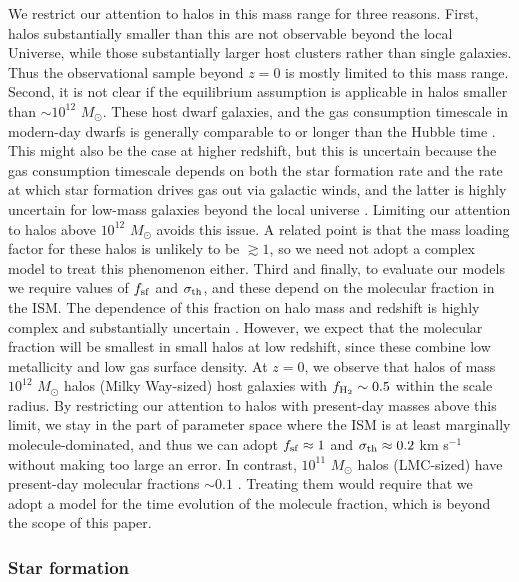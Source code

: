 \documentclass[useAMS,usenatbib]{mn2e}
\begin{document}
We restrict our attention to halos in this mass range for three reasons. First, halos substantially smaller than this are not observable beyond the local Universe, while those substantially larger host clusters rather than single galaxies. Thus the observational sample beyond $z=0$ is mostly limited to this mass range. Second, it is not clear if the equilibrium assumption is applicable in halos smaller than $\sim 10^{12}$ $M_\odot$. These host dwarf galaxies, and the gas consumption timescale in modern-day dwarfs is generally comparable to or longer than the Hubble time \citep[e.g.,][]{bolatto11a, hunter12a, jameson16a}. This might also be the case at higher redshift, but this is uncertain because the gas consumption timescale depends on both the star formation rate and the rate at which star formation drives gas out via galactic winds, and the latter is highly uncertain for low-mass galaxies beyond the local universe \citep{forbes14b}. Limiting our attention to halos above $10^{12}$ $M_\odot$ avoids this issue. A related point is that the mass loading factor for these halos is unlikely to be $\gtrsim 1$, so we need not adopt a complex model to treat this phenomenon either. Third and finally, to evaluate our models we require values of $f_{\rm sf}$ and $\sigma_{\rm th}$, and these depend on the molecular fraction in the ISM. The dependence of this fraction on halo mass and redshift is highly complex and substantially uncertain \citep[e.g.,][]{obreschkow09a, fu10a, lagos11a, krumholz12d, forbes14a}. However, we expect that the molecular fraction will be smallest in small halos at low redshift, since these combine low metallicity and low gas surface density. At $z=0$, we observe that halos of mass $10^{12}$ $M_\odot$ halos (Milky Way-sized) host galaxies with $f_{\rm H_2}\sim 0.5$ within the scale radius. By restricting our attention to halos with present-day masses above this limit, we stay in the part of parameter space where the ISM is at least marginally molecule-dominated, and thus we can adopt $f_{\rm sf} \approx 1$ and $\sigma_{\rm th} \approx 0.2$ km s$^{-1}$ without making too large an error. In contrast, $10^{11}$ $M_\odot$ halos (LMC-sized) have present-day molecular fractions $\sim 0.1$ \citep[e.g.,][]{jameson16a}. Treating them would require that we adopt a model for the time evolution of the molecule fraction, which is beyond the scope of this paper. 


\subsubsection{Star formation}
\end{document}

